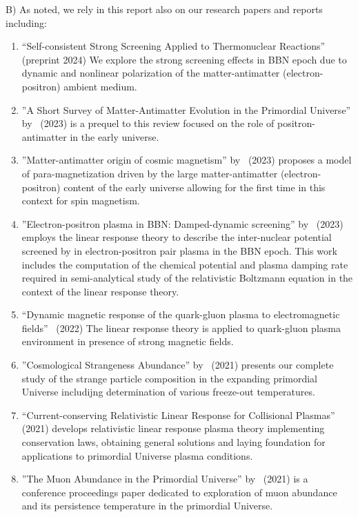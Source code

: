 B) As noted, we rely in this report also on our  research papers and reports including:
\begin{enumerate}
\item {\small ``Self-consistent Strong Screening Applied to Thermonuclear Reactions''}~\cite{Grayson:2024uwg} (preprint 2024) We explore the strong screening effects in BBN epoch due to dynamic and nonlinear polarization of the matter-antimatter (electron-positron) ambient medium.
%
 \item ''A Short Survey of Matter-Antimatter Evolution in the Primordial 
Universe'' by~\cite{Rafelski:2023emw} (2023) is a prequel to this review  focused on the role of positron-antimatter in the early universe. 
%
\item ''Matter-antimatter origin of cosmic magnetism'' 
by~\cite{Steinmetz:2023nsc} (2023) proposes a model of para-magnetization driven by the large 
matter-antimatter (electron-positron) content of the early universe allowing for the first time in this context for spin magnetism.
%
\item ''Electron-positron plasma in BBN: Damped-dynamic screening'' by~\cite{Grayson:2023flr} (2023) employs the linear response theory to describe the inter-nuclear potential screened by in electron-positron pair plasma in the BBN epoch. This work includes the computation of the chemical potential and plasma damping rate required in semi-analytical study of the relativistic Boltzmann equation in the context of the linear response theory.  
%
\item ``Dynamic magnetic response of the quark-gluon plasma to electromagnetic fields''~\cite{Grayson:2022asf} (2022) The linear response theory is applied to quark-gluon plasma environment in presence of strong magnetic fields.
%
\item ''Cosmological Strangeness Abundance'' by~\cite{Yang:2021bko} (2021) presents our complete  study of the strange particle composition in the expanding primordial  Universe includijng determination of various  freeze-out temperatures.
%
\item ``Current-conserving Relativistic Linear Response for Collisional Plasmas''~\cite{Formanek:2021blc} (2021) develops relativistic linear response plasma theory implementing conservation laws, obtaining general solutions and laying foundation for applications to primordial Universe plasma conditions.
%
\item ''The Muon Abundance in the Primordial Universe'' by~\cite{Rafelski:2021aey} (2021) is a conference proceedings paper dedicated to exploration of  muon abundance and its persistence temperature in the primordial Universe. 

\end{enumerate}
